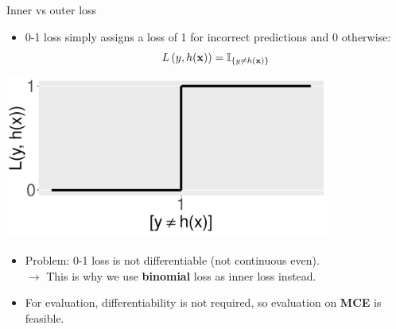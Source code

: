 \begin{vbframe}{Inner vs outer loss}
\begin{minipage}{0.6\textwidth}
  \begin{itemize}
    \item 0-1 loss simply assigns a loss of 1 for incorrect predictions and 0
    otherwise: $$L\left(y, h(\mathbf{x})\right) = \mathbb{I}_{\{y \neq h(\mathbf{x})\}}$$
  \end{itemize}
\end{minipage}%
\begin{minipage}{0.4\textwidth}
  \centering
  \includegraphics[width=0.8\textwidth]{figure/zero-one-loss}
\end{minipage}

\lz

\begin{itemize}
  \item Problem: 0-1 loss is not differentiable (not continuous even). \\
  $\rightarrow$ This is why we use \textbf{binomial} loss as inner loss 
  instead.
  \item For evaluation, differentiability is not required, so evaluation on 
  \textbf{MCE} is feasible. 
\end{itemize}

\normalsize

\end{vbframe}


\endlecture

